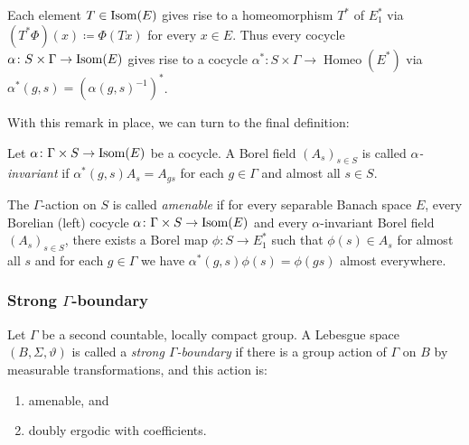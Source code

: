 \begin{rem}
  Each element \(T \in \operatorname{Isom}(E)\) gives rise to a homeomorphism \(T^\ast\) of \(E^\ast_1\) via \((T^\ast\Phi)(x) \coloneqq \Phi(Tx)\) for every \(x \in E\). Thus every cocycle \(\alpha \colon S \times \Gamma \to \operatorname{Isom}(E)\) gives rise to a cocycle \(\alpha^\ast \colon S \times \Gamma \to \operatorname{Homeo}(E^\ast)\) via \(\alpha^\ast (g, s) = (\alpha(g, s)^{-1})^\ast\).
\end{rem}

With this remark in place, we can turn to the final definition:

\begin{defin}
  Let \(\alpha\colon \Gamma \times S \to \operatorname{Isom}(E)\) be a cocycle. A Borel field \((A_s)_{s \in S}\) is called \emph{\(\alpha\)-invariant} if \(\alpha^\ast(g, s) A_{s} = A_{gs}\) for each \(g \in \Gamma\) and almost all \(s \in S\).

  The \(\Gamma\)-action on \(S\) is called \emph{amenable} if for every separable Banach space \(E\), every Borelian (left) cocycle \(\alpha \colon \Gamma \times S \to \operatorname{Isom}(E)\) and every \(\alpha\)-invariant Borel field \((A_s)_{s \in S}\), there exists a Borel map \(\phi \colon S \to E^\ast_1\) such that \(\phi(s) \in A_s\) for almost all \(s\) and for each \(g \in \Gamma\) we have \(\alpha^\ast(g, s) \phi(s) = \phi(gs)\) almost everywhere.
\end{defin}

\subsubsection*{Strong \(\Gamma\)-boundary}
\label{str-bdry}

\begin{defin}
  Let \(\Gamma\) be a second countable, locally compact group. A Lebesgue space \((B, \Sigma, \vartheta)\) is called a \emph{strong \(\Gamma\)-boundary} if there is a group action of \(\Gamma\) on \(B\) by measurable transformations, and this action is:
  \begin{enumerate}
  \item amenable, and
  \item doubly ergodic with coefficients.
  \end{enumerate}
\end{defin}

